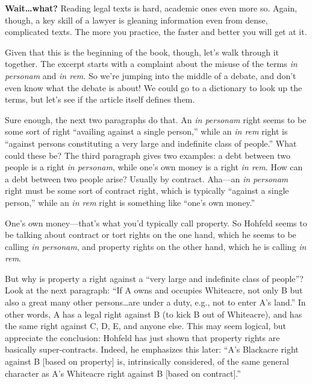 
\item \textbf{Wait\ldots what?} Reading legal texts is hard, academic ones even
more so. Again, though, a key skill of a lawyer is gleaning information even
from dense, complicated texts. The more you practice, the faster and better you
will get at it.

Given that this is the beginning of the book, though, let's walk through it
together. The excerpt starts with a complaint about the
misuse of the terms \emph{in personam} and \emph{in rem}. So we're jumping into
the middle of a debate, and don't even know what the debate is about! We could
go to a dictionary to look up the terms, but let's see if the article itself
defines them.

Sure enough, the next two paragraphs do that. An \emph{in personam} right seems
to be some sort of right ``availing against a single person,'' while an \emph{in
rem} right is ``against persons constituting a very large and indefinite class
of people.'' What could these be? The third paragraph gives two examples: a debt
between two people is a right \emph{in personam}, while one's own money is a
right \emph{in rem}. How can a debt between two people arise? Usually by
contract. Aha---an \emph{in personam} right must be some sort of contract right,
which is typically ``against a single person,'' while an \emph{in rem} right is
something like ``one's own money.''

One's own money---that's what you'd typically call property. So Hohfeld seems to
be talking about contract or tort rights on the one hand, which he seems to be
calling \emph{in personam}, and property rights on the other hand, which he is
calling \emph{in rem}.

\item \label{hohfeld-right}
But why is property a right against a ``very large and indefinite
class of people''? Look at the next paragraph: ``If A owns and occupies
Whiteacre, not only B but also a great many other persons\ldots are under a
duty, e.g., not to enter A's land.'' In other words, A has a legal right against
B (to kick B out of Whiteacre), and has the same right against C, D, E, and
anyone else. This may seem logical, but appreciate the conclusion: Hohfeld has
just shown that property rights are basically super-contracts. Indeed, he
emphasizes this later: ``A's Blackacre right against B [based on property] is,
intrinsically considered, of the same general character as A's Whiteacre right
against B [based on contract].''

